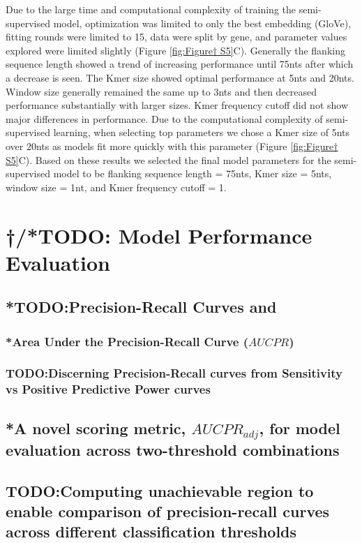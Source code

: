\documentclass{report}
\begin{document}
Due to the large time and computational complexity of training the semi-supervised model, optimization was limited to only the best embedding (GloVe), fitting rounds were limited to 15, data were split by gene, and parameter values explored were limited slightly (Figure \ref{fig:Figure† S5}C). Generally the flanking sequence length showed a trend of increasing performance until 75nts after which a decrease is seen. The Kmer size showed optimal performance at 5nts and 20nts. Window size generally remained the same up to 3nts and then decreased performance substantially with larger sizes. Kmer frequency cutoff did not show major differences in performance. Due to the computational complexity of semi-supervised learning, when selecting top parameters we chose a Kmer size of 5nts over 20nts as models fit more quickly with this parameter (Figure \ref{fig:Figure† S5}C). Based on these results we selected the final model parameters for the semi-supervised model to be flanking sequence length = 75nts, Kmer size = 5nts, window size = 1nt, and Kmer frequency cutoff = 1. 


\section{†/*TODO: Model Performance Evaluation}\label{met:model performance eval}
\subsection{*TODO:Precision-Recall Curves and}\label{met:precision-recall curve}
\subsubsection{*Area Under the Precision-Recall Curve ($AUCPR$)}\label{met:AUCPR}
\subsubsection{TODO:Discerning Precision-Recall curves from Sensitivity vs Positive Predictive Power curves}
\subsection{*A novel scoring metric, $AUCPR_{adj}$, for model evaluation across two-threshold combinations}\label{met:AUCPRadj}






\subsection{TODO:Computing unachievable region to enable comparison of precision-recall curves across different classification thresholds}\label{met:unachievable region}
\end{document}
